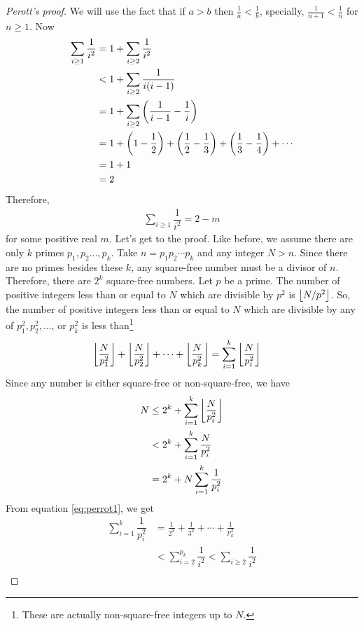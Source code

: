 	\begin{proof}[Perott's proof]
		We will use the fact that if $a>b$ then $\frac1a<\frac1b$, specially, $\frac1{n+1}<\frac1n$ for $n\geq1$. Now
			\begin{align*}
				\sum_{i\geq1}\dfrac1{i^2} 	& = 1+ \sum_{i\geq2}\dfrac1{i^2}\\
											& < 1+\sum_{i\geq2}\dfrac1{i(i-1)}\\
											& = 1+\sum_{i\geq2}\left(\dfrac1{i-1}-\dfrac1{i}\right)\\
											& = 1+\left(1 - \frac 12\right) + \left(\frac 12 - \frac 13\right) + \left(\frac 13 - \frac 14\right)  + \cdots\\
											& = 1+1\\
											& =2
			\end{align*}
		Therefore,
			\begin{align}
				\sum_{i\geq1}\dfrac1{i^2} =  2-m\label{eq:perrot1}
			\end{align}
		for some positive real $m$.
		Let's get to the proof. Like before, we assume there are only $k$ primes $p_1,p_2\ldots,p_k$. Take $n=p_1p_2\cdots p_k$ and any integer $N>n$. Since there are no primes besides these $k$, any square-free number must be a divisor of $n$. Therefore, there are $2^k$ square-free numbers. Let $p$ be a prime. The number of positive integers less than or equal to $N$ which are divisible by $p^2$ is $\left\lfloor{N/{p^2}}\right\rfloor$. So, the number of positive integers less than or equal to $N$ which are divisible by any of $p_1^2,p_2^2,\ldots$, or $p_k^2$ is less than\footnote{These are actually non-square-free integers up to $N$.}
			\begin{align*}
				\left\lfloor{\dfrac N{p_1^2}}\right\rfloor+\left\lfloor{\dfrac N{p_2^2}}\right\rfloor+\cdots+\left\lfloor{\dfrac N{p_k^2}}\right\rfloor
					& = \sum_{i=1}^k\left\lfloor{\dfrac N{p_i^2}}\right\rfloor
			\end{align*}
		Since any number is either square-free or non-square-free, we have
			\begin{align}
			N	& \leq2^k+\sum_{i=1}^k \left\lfloor{\dfrac N{p_i^2}}\right\rfloor\nonumber\\
				& < 2^k+\sum_{i=1}^k \dfrac N{p_i^2} \nonumber\\
				& = 2^k+N\sum_{i=1}^k \dfrac 1{p_i^2}\label{eq:perrot2}
			\end{align}
		From equation \eqref{eq:perrot1}, we get
			\begin{align*}
				\sum_{i=1}^k \dfrac 1{p_i^2} & = \frac{1}{2^2}+ \frac{1}{3^2}+ \cdots + \frac{1}{p_k^2} \\
										 & < \sum_{i=2}^{p_k} \dfrac 1{i^2}  < \sum_{i\geq 2}\dfrac 1{i^2}\\

\end{align*}
\end{proof}
